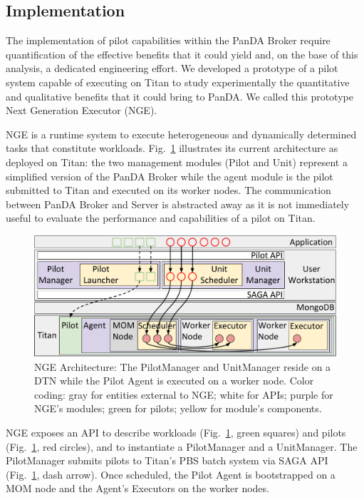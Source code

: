 \subsection{Implementation}
\label{sec:arch}

The implementation of pilot capabilities within the PanDA Broker require
quantification of the effective benefits that it could yield and, on the base
of this analysis, a dedicated engineering effort. We developed a prototype of
a pilot system capable of executing on Titan to study experimentally the
quantitative and qualitative benefits that it could bring to PanDA\@. We
called this prototype Next Generation Executor (NGE).

NGE is a runtime system to execute heterogeneous and dynamically determined
tasks that constitute workloads. Fig.~\ref{fig:arch-overview} illustrates its
current architecture as deployed on Titan: the two management modules (Pilot
and Unit) represent a simplified version of the PanDA Broker while the agent
module is the pilot submitted to Titan and executed on its worker nodes. The
communication between PanDA Broker and Server is abstracted away as it is not
immediately useful to evaluate the performance and capabilities of a pilot on
Titan.

\begin{figure}
  \centering
   \includegraphics[width=\columnwidth]{figures/rp_architecture_compact_atlaswms_paper.pdf}
   \vspace{-0.3in}
  \caption{NGE Architecture: The PilotManager and UnitManager reside on a DTN
  while the Pilot Agent is executed on a worker node. Color coding: gray for
  entities external to NGE\@; white for APIs; purple for NGE's modules; green
  for pilots; yellow for module's components.}
\label{fig:arch-overview}
\end{figure}

NGE exposes an API to describe workloads (Fig.~\ref{fig:arch-overview}, green
squares) and pilots (Fig.~\ref{fig:arch-overview}, red circles), and to
instantiate a PilotManager and a UnitManager. The PilotManager submits pilots
to Titan's PBS batch system via SAGA API (Fig.~\ref{fig:arch-overview}, dash
arrow). %
Once scheduled, the Pilot Agent is bootstrapped on a MOM node and the
Agent's Executors on the worker nodes.

